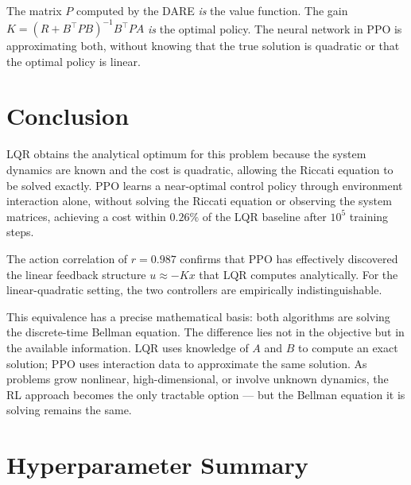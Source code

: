 \documentclass[11pt, a4paper]{article}
\newcommand{\T}{^\top}
\begin{document}
The matrix $P$ computed by the DARE \emph{is} the value function. The
gain $K = (R + B\T PB)^{-1}B\T PA$ \emph{is} the optimal policy. The
neural network in PPO is approximating both, without knowing that the
true solution is quadratic or that the optimal policy is linear.

\section{Conclusion}

LQR obtains the analytical optimum for this problem because the system
dynamics are known and the cost is quadratic, allowing the Riccati
equation to be solved exactly. PPO learns a near-optimal control policy
through environment interaction alone, without solving the Riccati
equation or observing the system matrices, achieving a cost within
$0.26\%$ of the LQR baseline after $10^5$ training steps.

The action correlation of $r = 0.987$ confirms that PPO has effectively
discovered the linear feedback structure $u \approx -Kx$ that LQR
computes analytically. For the linear-quadratic setting, the two
controllers are empirically indistinguishable.

This equivalence has a precise mathematical basis: both algorithms are
solving the discrete-time Bellman equation. The difference lies not in
the objective but in the available information. LQR uses knowledge of
$A$ and $B$ to compute an exact solution; PPO uses interaction data to
approximate the same solution. As problems grow nonlinear, high-dimensional,
or involve unknown dynamics, the RL approach becomes the only tractable
option — but the Bellman equation it is solving remains the same.

\appendix
\section{Hyperparameter Summary}
\end{document}
